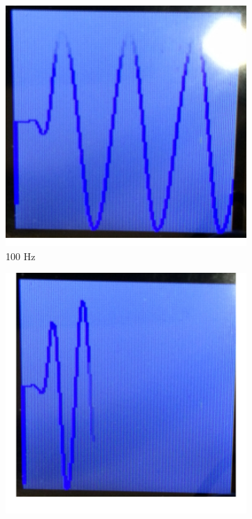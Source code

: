 \documentclass[12pt]{article}
\begin{document}
\begin{figure}[H]
  \centering
  \begin{subfigure}[b]{0.3\textwidth}
    \includegraphics[width=\textwidth]{./img/filtered_100Hz}
    \caption{100 Hz}
    \label{fig:filtered_100}
  \end{subfigure}
  \begin{subfigure}[b]{0.3\textwidth}
    \includegraphics[width=\textwidth]{./img/filtered_200Hz}

\end{subfigure}
\end{figure}
\end{document}
